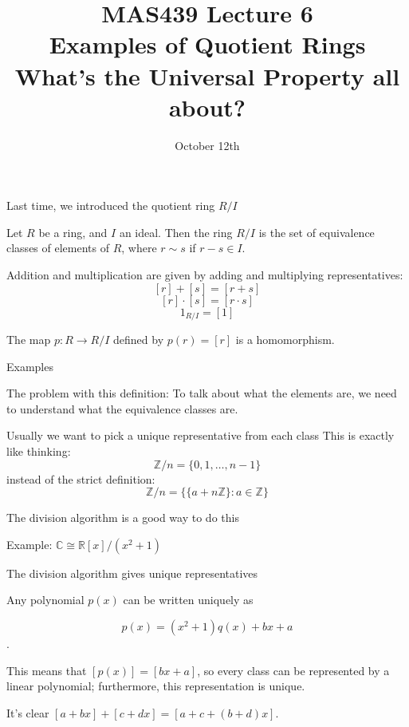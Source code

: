 \documentclass{beamer}
\title{MAS439 Lecture 6 \\ Examples of Quotient Rings \\ What's the Universal Property all about?}
\date{October 12th}
\newcommand{\C}{\mathbb{C}}
\newcommand{\Z}{\mathbb{Z}}
\newcommand{\R}{\mathbb{R}}
\begin{document}
\begin{frame}
\titlepage
\end{frame}

\begin{frame}{Last time, we introduced the quotient ring $R/I$}
  \begin{definition} Let $R$ be a ring, and $I$ an ideal.  Then the ring $R/I$ is the set of equivalence classes of elements of $R$, where $r\sim s$ if $r-s\in I$.

    Addition and multiplication are given by adding and multiplying representatives:
    $$[r]+[s]=[r+s]$$
    $$[r]\cdot [s]=[r\cdot s]$$
    $$1_{R/I}=[1]$$
  \end{definition}

  \begin{lemma}The map $p:R\to R/I$ defined by $p(r)=[r]$ is a homomorphism.
  \end{lemma}
  \end{frame}


\begin{frame}[plain,c]

\begin{center}

\Huge

Examples
\end{center}

\end{frame}

\begin{frame}{The problem with this definition:}
  To talk about what the elements are, we need to understand what the equivalence classes are.

  \begin{block}{Usually we want to pick a unique representative from each class}
    This is exactly like thinking:
    $$\Z/n=\{0,1,\dots, n-1\}$$
    instead of the strict definition:
    $$\Z/n=\Big\{\{a+n\Z\} : a\in \Z\Big\}$$
    \end{block}
  \begin{block}{The division algorithm is a good way to do this}
    \end{block}


  \end{frame}

\begin{frame}{Example: $\C\cong\R[x]/(x^2+1)$}

\begin{block}{The division algorithm gives unique representatives}

Any polynomial $p(x)$ can be written uniquely as

 $$p(x)=(x^2+1)q(x)+bx+a$$. 

This means that $[p(x)]=[bx+a]$, so every class can be represented by a linear polynomial; furthermore, this representation is unique.
\end{block}

It's clear $[a+bx]+[c+dx]=[a+c+(b+d)x]$.
\end{frame}
\end{document}
